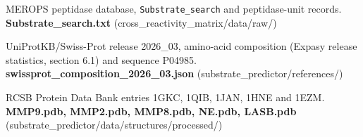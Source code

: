 \documentclass[10pt,a4paper]{article}
\numberwithin{equation}{section}
\begin{document}
\begin{enumerate}[label={[\arabic*]},noitemsep,leftmargin=*]
\item MEROPS peptidase database, \texttt{Substrate\_search} and peptidase-unit
  records. \textbf{Substrate\_search.txt} (cross\_reactivity\_matrix/data/raw/)

\item UniProtKB/Swiss-Prot release 2026\_03, amino-acid composition (Expasy
  release statistics, section 6.1) and sequence P04985.
  \textbf{swissprot\_composition\_2026\_03.json} (substrate\_predictor/references/)

\item RCSB Protein Data Bank entries 1GKC, 1QIB, 1JAN, 1HNE and 1EZM.
  \textbf{MMP9.pdb, MMP2.pdb, MMP8.pdb, NE.pdb, LASB.pdb}
  (substrate\_predictor/data/structures/processed/)

\end{enumerate}
\end{document}
